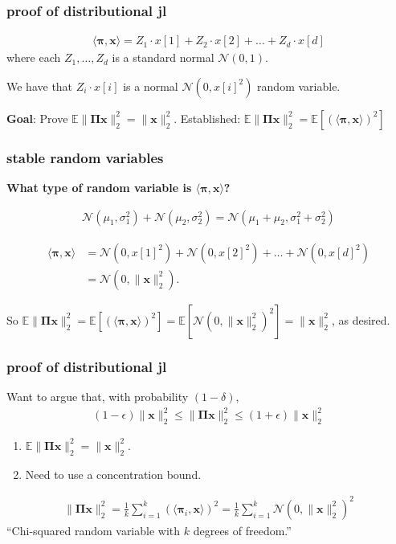 \documentclass[compress]{beamer}
\newcommand{\bs}[1]{\boldsymbol{#1}}
\newcommand{\bv}[1]{\mathbf{#1}}
\newcommand{\E}{\mathbb{E}}
\begin{document}
\begin{frame}
	\frametitle{proof of distributional jl}	
	\begin{align*}
		\langle\bs{\pi},\bv{x}\rangle = Z_1\cdot{x}[1] + Z_2\cdot{x}[2]  +  \ldots + Z_d\cdot{x}[d]
	\end{align*}
	where each $Z_1, \ldots, Z_d$ is a standard normal $\mathcal{N}(0,1)$. 
	
	We have that $Z_i \cdot{x}[i]$ is a normal $\mathcal{N}(0,{x}[i]^2)$ random variable.
	
	\vspace{5em}
	\begin{block}{\vspace*{-3ex}}
		\small \textbf{Goal}: Prove $\E \|\bs{\Pi} \bv{x} \|_2^2 = \|\bv{x}\|_2^2$. Established: $\E \|\bs{\Pi} \bv{x} \|_2^2 = \E\left[\left(\langle\bs{\pi},\bv{x}\rangle\right)^2 \right]$
	\end{block}
\end{frame}

\begin{frame}[t]
	\frametitle{stable random variables}
	\textbf{What type of random variable is $\langle\bs{\pi},\bv{x}\rangle$?}
	\begin{fact}
		\begin{align*}
			\mathcal{N}(\mu_1, \sigma_1^2) + \mathcal{N}(\mu_2, \sigma_2^2) =  \mathcal{N}(\mu_1 + \mu_2, \sigma_1^2 + \sigma_2^2)
		\end{align*}
	\end{fact}
	\begin{align*}
		\langle\bs{\pi},\bv{x}\rangle &= \mathcal{N}(0,{x}[1]^2) + \mathcal{N}(0,{x}[2]^2) + \ldots + \mathcal{N}(0,{x}[d]^2) \\ &= \mathcal{N}(0,\|\bv{x}\|_2^2). 
	\end{align*}
	
	So $\E \|\bs{\Pi} \bv{x} \|_2^2 = \E\left[\left(\langle\bs{\pi},\bv{x}\rangle\right)^2 \right] = \E\left[\mathcal{N}(0,\|\bv{x}\|_2^2)^2\right]  = \|\bv{x}\|_2^2$, as desired.
\end{frame}

\begin{frame}
	\frametitle{proof of distributional jl}
	Want to argue that, with probability $(1-\delta)$,
	\begin{align*}
		(1-\epsilon)\|\bv{x}\|_2^2 \leq \|\bs{\Pi}\bv{x}\|_2^2 \leq (1+\epsilon)\|\bv{x}\|_2^2 
	\end{align*}
	
	\begin{enumerate}
		\item $\E \|\bs{\Pi} \bv{x} \|_2^2 = \|\bv{x}\|_2^2$.
		\item Need to use a concentration bound.
	\end{enumerate}
	\begin{align*}
		\|\bs{\Pi} \bv{x} \|_2^2 = \frac{1}{k}\sum_{i=1}^k \left(\langle\bs{\pi}_i,\bv{x}\rangle\right)^2 = \frac{1}{k}\sum_{i=1}^k \mathcal{N}(0,\|\bv{x}\|_2^2)^2
	\end{align*}
	\alert{``Chi-squared random variable with $k$ degrees of freedom.''}
\end{frame}
\end{document}
